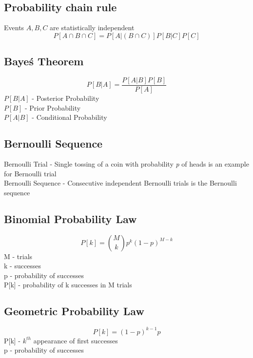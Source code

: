 \subsection{Probability chain rule}	
Events $A,B,C$ are statistically independent
\begin{equation*}
	P[A\cap B \cap C]=P[A|(B\cap C)]P[B|C]P[C]
\end{equation*}


\subsection{Baye\'s Theorem}

\begin{equation*}
	P[B|A]=\frac{P[A|B]P[B]}{P[A]}
\end{equation*}
$P[B|A]$ - {\color{red}Posterior} Probability \\
$P[B]$ - {\color{red}Prior} Probability\\
$P[A|B]$ - {\color{red}Conditional} Probability 



\subsection{Bernoulli Sequence}

{\color{red}Bernoulli Trial} - Single tossing of a coin with probability \emph{p} of heads is an example for Bernoulli trial\\
{\color{red}Bernoulli Sequence} - Consecutive independent Bernoulli trials is the Bernoulli sequence

\subsection{Binomial Probability Law}
\label{Binorm}
\begin{equation*}
	P[k]=\binom{M}{k}p^{k}(1-p)^{M-k}	
\end{equation*}
M - trials \\
k - successes \\
p - probability of successes \\
P[k] - probability of k successes in M trials 
 

\subsection{Geometric Probability Law}
\label{geom}
\begin{equation*}
	P[k]=(1-p)^{k-1}p
\end{equation*}
{\color{red}P[k] - $k^{th}$ appearance of first successes} \\
p - probability of successes 

